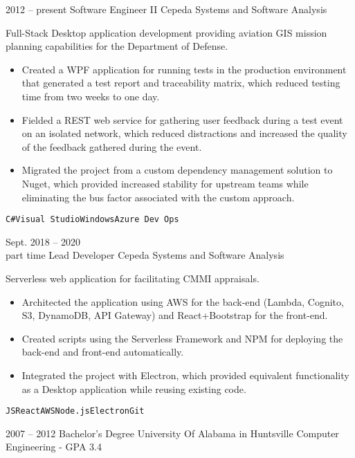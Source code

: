 \documentclass[9pt]{developercv} %
\begin{document}
\begin{entrylist}
	\entry
		{2012 -- present}
		{Software Engineer II}
		{Cepeda Systems and Software Analysis}
		{Full-Stack Desktop application development providing aviation GIS mission planning capabilities for the Department of Defense.\\
		\begin{itemize}
			\item Created a WPF application for running tests in the production environment that generated a test report and traceability matrix, which reduced testing time from two weeks to one day.
			\item Fielded a REST web service for gathering user feedback during a test event on an isolated network, which reduced distractions and increased the quality of the feedback gathered during the event.
			\item Migrated the project from a custom dependency management solution to Nuget, which provided increased stability for upstream teams while eliminating the bus factor associated with the custom approach.
		\end{itemize}
		\texttt{C\#}\slashsep\texttt{Visual Studio}\slashsep\texttt{Windows}\slashsep\texttt{Azure Dev Ops}}
	\entry
		{Sept. 2018 -- 2020\\\footnotesize{part time}}
		{Lead Developer}
		{Cepeda Systems and Software Analysis}
		{Serverless web application for facilitating CMMI appraisals.\\
		\begin{itemize}
			\item Architected the application using AWS for the back-end (Lambda, Cognito, S3, DynamoDB, API Gateway) and React+Bootstrap for the front-end.
			\item Created scripts using the Serverless Framework and NPM for deploying the back-end and front-end automatically. 
			\item Integrated the project with Electron, which provided equivalent functionality as a Desktop application while reusing existing code.
		\end{itemize}
		\texttt{JS}\slashsep\texttt{React}\slashsep\texttt{AWS}\slashsep\texttt{Node.js}\slashsep\texttt{Electron}\slashsep\texttt{Git}}
\end{entrylist}



\begin{entrylist}
	\entry
		{2007 -- 2012}
		{Bachelor's Degree}
		{University Of Alabama in Huntsville}
		{Computer Engineering - GPA 3.4}
\end{entrylist}


\begin{entrylist}
\end{entrylist}
\end{document}
